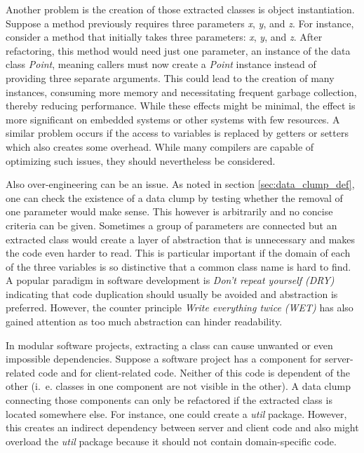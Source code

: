 Another problem is the creation of those extracted classes is object instantiation. Suppose a method previously requires three parameters \textit{x}, \textit{y}, and \textit{z}. For instance, consider a method that initially takes three parameters: \textit{x}, \textit{y}, and \textit{z}. After refactoring, this method would need just one parameter, an instance of the data class \textit{Point}, meaning callers must now create a \textit{Point} instance instead of providing three separate arguments. This could lead to the creation of many instances, consuming more memory and necessitating frequent garbage collection, thereby reducing performance. While these effects might be minimal, the effect is more significant on embedded systems or other systems with few resources. A similar problem occurs if the access to variables is replaced by getters or setters which also creates some overhead. While many compilers are capable of optimizing such issues, they should nevertheless be considered. 

Also over-engineering can be an issue. As noted in section \ref{sec:data_clump_def}, one can check the existence of a data clump by testing whether the removal of one parameter would make sense. This however is arbitrarily and no concise criteria can be given. Sometimes a group of parameters are connected but an extracted class would create a layer of abstraction that is unnecessary and makes the code even harder to read. This is particular important if the domain of each of the three variables is so distinctive that a common class name is hard to find. 
A popular paradigm in software development is \textit{Don't repeat yourself (DRY)} indicating that code duplication should usually be avoided and abstraction is preferred. However, the counter principle \textit{Write everything twice (WET)} has also gained attention as too much abstraction can hinder readability. \cite{dry}

In modular software projects, extracting a class can cause unwanted or even impossible dependencies.  Suppose a software project has a component for server-related code and for client-related code. Neither of this code is dependent of the other (i.~e. classes in one component are not visible in the other). A data clump connecting those components can only be refactored if the extracted class is located somewhere else. For instance, one could create a \textit{util} package. However, this creates an indirect dependency between server and client code and also might overload the \textit{util} package because it should not contain domain-specific code. 


